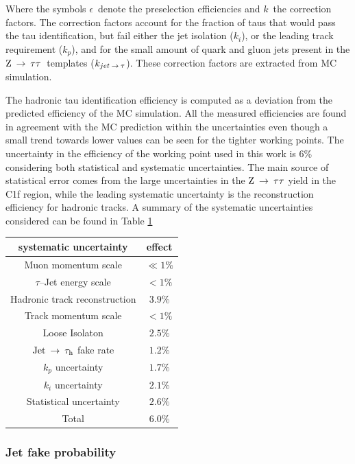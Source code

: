 Where the symbols $\epsilon$\ denote the preselection efficiencies and $k$\ the correction factors. The correction factors account for the fraction of taus that would pass the tau identification, but fail either the jet isolation ($k_i$), or the leading track requirement ($k_p$), and for the small amount of quark and gluon jets present in the $\mathrm{Z}\:\rightarrow\:\tau\tau$\ templates ($k_{jet \:\rightarrow\: \tau}$). These correction factors are extracted from MC simulation. 

The hadronic tau identification efficiency is computed as a deviation from the predicted efficiency of the MC simulation. All the measured efficiencies are found in agreement with the MC prediction within the uncertainties even though a small trend towards lower values can be seen for the tighter working points. The uncertainty in the efficiency of the working point used in this work is 6\% considering both statistical and systematic uncertainties. The main source of statistical error comes from the large uncertainties in the $\mathrm{Z}\:\rightarrow\:\tau\tau$ yield in the C1f region, while the leading systematic uncertainty is the reconstruction efficiency for hadronic tracks. A summary of the systematic uncertainties considered can be found in Table \ref{tab:tau_eff_sys}

\begin{table}
\begin{center}
\begin{tabular}{|c|c|}
 \hline
 systematic uncertainty & effect \\
 \hline
Muon momentum scale & $\ll 1\%$ \\
$\tau$--Jet energy scale & $ < 1\%$ \\
Hadronic track reconstruction & $3.9\%$ \\
Track momentum scale & $< 1\%$ \\
Loose Isolaton & $2.5\%$ \\
$\rm{Jet}\:\rightarrow\:\tau_h$ fake rate & $1.2\%$ \\
$k_p$ uncertainty & $1.7\%$ \\
$k_i$ uncertainty & $2.1\%$ \\
Statistical uncertainty & $2.6\%$ \\
\hline
Total & $6.0\%$ \\
\hline
\end{tabular}
\end{center}
\label{tab:tau_eff_sys}
\end{table}


\subsubsection{Jet fake probability}

